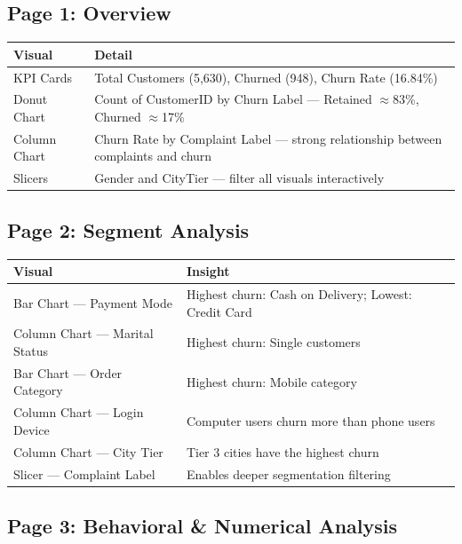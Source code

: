 \documentclass[11pt,a4paper]{article}
\begin{document}
\subsection{Page 1: Overview}

\begin{table}[H]
\centering
{}
\begin{tabularx}{\textwidth}{l X}
\toprule
\textbf{Visual} & \textbf{Detail} \\
\midrule
KPI Cards & Total Customers (5,630), Churned (948), Churn Rate (16.84\%) \\
Donut Chart & Count of CustomerID by Churn Label --- Retained $\approx$83\%, Churned $\approx$17\% \\
Column Chart & Churn Rate by Complaint Label --- strong relationship between complaints and churn \\
Slicers & Gender and CityTier --- filter all visuals interactively \\
\bottomrule
\end{tabularx}
\end{table}

\subsection{Page 2: Segment Analysis}

\begin{table}[H]
\centering
{}
\begin{tabularx}{\textwidth}{l X}
\toprule
\textbf{Visual} & \textbf{Insight} \\
\midrule
Bar Chart --- Payment Mode & Highest churn: Cash on Delivery; Lowest: Credit Card \\
Column Chart --- Marital Status & Highest churn: Single customers \\
Bar Chart --- Order Category & Highest churn: Mobile category \\
Column Chart --- Login Device & Computer users churn more than phone users \\
Column Chart --- City Tier & Tier 3 cities have the highest churn \\
Slicer --- Complaint Label & Enables deeper segmentation filtering \\
\bottomrule
\end{tabularx}
\end{table}

\subsection{Page 3: Behavioral \& Numerical Analysis}
\end{document}
